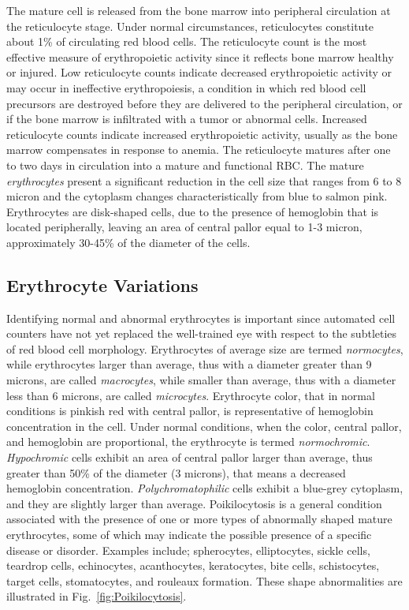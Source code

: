 The mature cell is released from the bone marrow into peripheral circulation at the reticulocyte stage. Under normal circumstances, reticulocytes constitute about 1\% of circulating red blood cells. The reticulocyte count is the most effective measure of erythropoietic activity since it reflects bone marrow healthy or injured. Low reticulocyte counts indicate decreased erythropoietic activity or may occur in ineffective erythropoiesis, a condition in which red blood cell precursors are destroyed before they are delivered to the peripheral circulation, or if the bone marrow is infiltrated with a tumor or abnormal cells. Increased reticulocyte counts indicate increased erythropoietic activity, usually as the bone marrow compensates in response to anemia. The reticulocyte matures after one to two days in circulation into a mature and functional RBC. The mature \textit{erythrocytes} present a significant reduction in the cell size that ranges from 6 to 8 micron and the cytoplasm changes characteristically from blue to salmon pink. Erythrocytes are disk-shaped cells, due to the presence of hemoglobin that is located peripherally, leaving an area of central pallor equal to 1-3 micron, approximately 30-45\% of the diameter of the cells. 

\subsection{Erythrocyte Variations}
Identifying normal and abnormal erythrocytes is important since automated cell counters have not yet replaced the well-trained eye with respect to the subtleties of red blood cell morphology. Erythrocytes of average size are termed \textit{normocytes}, while erythrocytes larger than average, thus with a diameter greater than 9 microns, are called \textit{macrocytes}, while smaller than average, thus with a diameter less than 6 microns, are called \textit{microcytes}. Erythrocyte color, that in normal conditions is pinkish red with central pallor, is representative of hemoglobin concentration in the cell. Under normal conditions, when the color, central pallor, and hemoglobin are proportional, the erythrocyte is termed \textit{normochromic}. \textit{Hypochromic} cells exhibit an area of central pallor larger than average, thus greater than 50\% of the diameter (3 microns), that means a decreased hemoglobin concentration. \textit{Polychromatophilic} cells exhibit a blue-grey cytoplasm, and they are slightly larger than average. Poikilocytosis is a general condition associated with the presence of one or more types of abnormally shaped mature erythrocytes, some of which may indicate the possible presence of a specific disease or disorder. Examples include; spherocytes, elliptocytes, sickle cells, teardrop cells, echinocytes, acanthocytes, keratocytes, bite cells, schistocytes, target cells, stomatocytes, and rouleaux formation. These shape abnormalities are illustrated in Fig.~\ref{fig:Poikilocytosis}.

